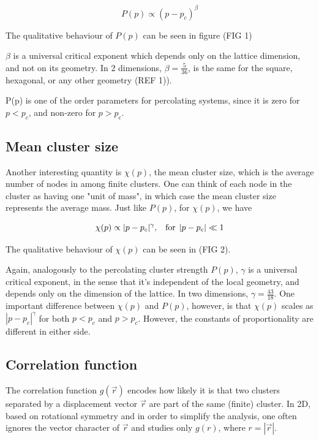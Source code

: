 $$
    P(p) \propto (p - p_c)^\beta 
$$

The qualitative behaviour of $P(p)$ can be seen in figure (FIG 1)


$\beta$ is a universal critical exponent which depends only on the lattice dimension, and not on its geometry. In 2 dimensions, $\beta = \frac{5}{36}$, is the same for the square, hexagonal, or any other geometry (REF 1)). 

P(p) is one of the order parameters for percolating systems, since it is zero for $p < p_c$, and non-zero for $p > p_c$.

\subsection{Mean cluster size}

Another interesting quantity is $\chi(p)$, the mean cluster size, which is the average number of nodes in among finite clusters. One can think of each node in the cluster as having one "unit of mass", in which case the mean cluster size represents the average mass. Just like $P(p)$, for $\chi(p)$, we have

$$ 
    \chi(p) \propto  |p - p_c|^\gamma \textrm{,} \hspace{0.35cm}  \textrm{for} \hspace{0.15cm} |p - p_c| \ll 1 
$$ 

The qualitative behaviour of $\chi(p)$ can be seen in (FIG 2).


Again, analogously to the percolating cluster strength $P(p)$, $\gamma$ is a universal critical exponent, in the sense that it's independent of the local geometry, and depends only on the dimension of the lattice. In two dimensions, $\gamma = \frac{43}{18}$. One important difference between $\chi(p)$ and $P(p)$, however, is that $\chi(p)$ scales as $|p - p_c|^\gamma$ for both $p < p_c$ and $p > p_c$. However, the constants of proportionality are different in either side.


\subsection{Correlation function}

The correlation function $g(\vec{r})$ encodes how likely it is that two clusters separated by a displacement vector $\vec{r}$ are part of the same (finite) cluster. In 2D,  based on rotational symmetry and in order to simplify the analysis, one often ignores the vector character of  $\vec{r}$ and studies only $g(r)$, where $r = |\vec{r}|$.

